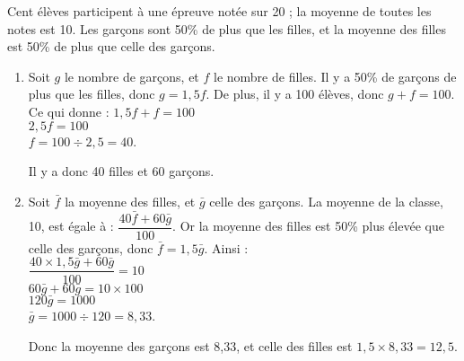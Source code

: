 \documentclass[12pt]{article}
\begin{document}
\begin{exercice}
  Cent élèves participent à une épreuve notée sur 20 ; la moyenne de toutes les notes est 10.
  Les garçons sont 50\% de plus que les filles, et la moyenne des filles est 50\% de plus que celle des garçons.
  \begin{enumerate}[(1)]
    \item Soit $g$ le nombre de garçons, et $f$ le nombre de filles. Il y a 50\% de garçons de plus que les filles, donc $g=1,5f$. De plus, il y a 100 élèves, donc $g+f=100$. Ce qui donne :
      $1,5f+f=100$\\
      $2,5f=100$\\
      $f=100\div2,5=40$.

      Il y a donc 40 filles et 60 garçons.
    \item Soit $\bar f$ la moyenne des filles, et $\bar g$ celle des garçons. La moyenne de la classe, 10, est égale à :
      $\dfrac{40\bar{f}+60\bar{g}}{100}$. Or la moyenne des filles est 50\% plus élevée que celle des garçons, donc $\bar{f}=1,5\bar{g}$. Ainsi :\\
      $\dfrac{40\times1,5\bar{g}+60\bar{g}}{100}=10$\\
      $60\bar{g}+60\bar{g}=10\times100$\\
      $120\bar{g}=1000$\\
      $\bar{g}=1000\div120=8,33$.

      Donc la moyenne des garçons est 8,33, et celle des filles est $1,5\times8,33=12,5$.
  \end{enumerate}
\end{exercice}
\end{document}
